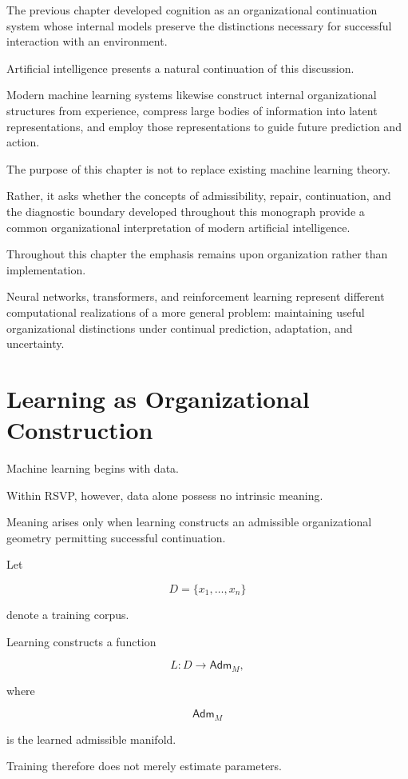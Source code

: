 \documentclass[11pt,oneside]{book}
\numberwithin{equation}{chapter}
\theoremstyle{definition}
\theoremstyle{plain}
\newcommand{\Adm}{\mathsf{Adm}}
\begin{document}
The previous chapter developed cognition as an organizational continuation
system whose internal models preserve the distinctions necessary for
successful interaction with an environment.

Artificial intelligence presents a natural continuation of this discussion.

Modern machine learning systems likewise construct internal organizational
structures from experience, compress large bodies of information into
latent representations, and employ those representations to guide future
prediction and action.

The purpose of this chapter is not to replace existing machine learning
theory.

Rather, it asks whether the concepts of admissibility, repair, continuation,
and the diagnostic boundary developed throughout this monograph provide a
common organizational interpretation of modern artificial intelligence.

Throughout this chapter the emphasis remains upon organization rather than
implementation.

Neural networks, transformers, and reinforcement learning represent
different computational realizations of a more general problem: maintaining
useful organizational distinctions under continual prediction, adaptation,
and uncertainty.

\section{Learning as Organizational Construction}

Machine learning begins with data.

Within RSVP, however, data alone possess no intrinsic meaning.

Meaning arises only when learning constructs an admissible organizational
geometry permitting successful continuation.

Let

\[
D
=
\{x_1,\ldots,x_n\}
\]

denote a training corpus.

Learning constructs a function

\[
L
:
D
\rightarrow
\Adm_M,
\]

where

\[
\Adm_M
\]

is the learned admissible manifold.

Training therefore does not merely estimate parameters.
\end{document}
